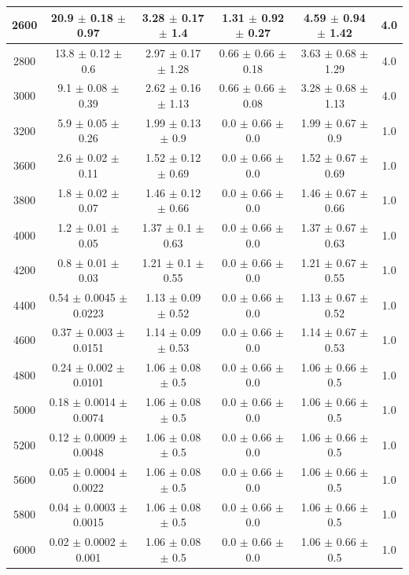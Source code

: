 \begin{table}[htp]
{\begin{tabular}{|c|c|c|c|c|c|}
			2600 & 20.9 $\pm$ 0.18 $\pm$ 0.97 & 3.28 $\pm$ 0.17 $\pm$ 1.4 & 1.31 $\pm$ 0.92 $\pm$ 0.27 & 4.59 $\pm$ 0.94 $\pm$ 1.42 & 4.0     \\ \hline
			2800 & 13.8 $\pm$ 0.12 $\pm$ 0.6 & 2.97 $\pm$ 0.17 $\pm$ 1.28 & 0.66 $\pm$ 0.66 $\pm$ 0.18 & 3.63 $\pm$ 0.68 $\pm$ 1.29 & 4.0     \\ \hline
			3000 & 9.1 $\pm$ 0.08 $\pm$ 0.39 & 2.62 $\pm$ 0.16 $\pm$ 1.13 & 0.66 $\pm$ 0.66 $\pm$ 0.08 & 3.28 $\pm$ 0.68 $\pm$ 1.13 & 4.0     \\ \hline
			3200 & 5.9 $\pm$ 0.05 $\pm$ 0.26 & 1.99 $\pm$ 0.13 $\pm$ 0.9 & 0.0 $\pm$ 0.66 $\pm$ 0.0 & 1.99 $\pm$ 0.67 $\pm$ 0.9 & 1.0     \\ \hline
			3600 & 2.6 $\pm$ 0.02 $\pm$ 0.11 & 1.52 $\pm$ 0.12 $\pm$ 0.69 & 0.0 $\pm$ 0.66 $\pm$ 0.0 & 1.52 $\pm$ 0.67 $\pm$ 0.69 & 1.0     \\ \hline
			3800 & 1.8 $\pm$ 0.02 $\pm$ 0.07 & 1.46 $\pm$ 0.12 $\pm$ 0.66 & 0.0 $\pm$ 0.66 $\pm$ 0.0 & 1.46 $\pm$ 0.67 $\pm$ 0.66 & 1.0     \\ \hline
			4000 & 1.2 $\pm$ 0.01 $\pm$ 0.05 & 1.37 $\pm$ 0.1 $\pm$ 0.63 & 0.0 $\pm$ 0.66 $\pm$ 0.0 & 1.37 $\pm$ 0.67 $\pm$ 0.63 & 1.0     \\ \hline
			4200 & 0.8 $\pm$ 0.01 $\pm$ 0.03 & 1.21 $\pm$ 0.1 $\pm$ 0.55 & 0.0 $\pm$ 0.66 $\pm$ 0.0 & 1.21 $\pm$ 0.67 $\pm$ 0.55 & 1.0     \\ \hline
			4400 & 0.54 $\pm$ 0.0045 $\pm$ 0.0223 & 1.13 $\pm$ 0.09 $\pm$ 0.52 & 0.0 $\pm$ 0.66 $\pm$ 0.0 & 1.13 $\pm$ 0.67 $\pm$ 0.52 & 1.0     \\ \hline
			4600 & 0.37 $\pm$ 0.003 $\pm$ 0.0151 & 1.14 $\pm$ 0.09 $\pm$ 0.53 & 0.0 $\pm$ 0.66 $\pm$ 0.0 & 1.14 $\pm$ 0.67 $\pm$ 0.53 & 1.0     \\ \hline
			4800 & 0.24 $\pm$ 0.002 $\pm$ 0.0101 & 1.06 $\pm$ 0.08 $\pm$ 0.5 & 0.0 $\pm$ 0.66 $\pm$ 0.0 & 1.06 $\pm$ 0.66 $\pm$ 0.5 & 1.0     \\ \hline
			5000 & 0.18 $\pm$ 0.0014 $\pm$ 0.0074 & 1.06 $\pm$ 0.08 $\pm$ 0.5 & 0.0 $\pm$ 0.66 $\pm$ 0.0 & 1.06 $\pm$ 0.66 $\pm$ 0.5 & 1.0     \\ \hline
			5200 & 0.12 $\pm$ 0.0009 $\pm$ 0.0048 & 1.06 $\pm$ 0.08 $\pm$ 0.5 & 0.0 $\pm$ 0.66 $\pm$ 0.0 & 1.06 $\pm$ 0.66 $\pm$ 0.5 & 1.0     \\ \hline
			5600 & 0.05 $\pm$ 0.0004 $\pm$ 0.0022 & 1.06 $\pm$ 0.08 $\pm$ 0.5 & 0.0 $\pm$ 0.66 $\pm$ 0.0 & 1.06 $\pm$ 0.66 $\pm$ 0.5 & 1.0     \\ \hline
			5800 & 0.04 $\pm$ 0.0003 $\pm$ 0.0015 & 1.06 $\pm$ 0.08 $\pm$ 0.5 & 0.0 $\pm$ 0.66 $\pm$ 0.0 & 1.06 $\pm$ 0.66 $\pm$ 0.5 & 1.0     \\ \hline
			6000 & 0.02 $\pm$ 0.0002 $\pm$ 0.001 & 1.06 $\pm$ 0.08 $\pm$ 0.5 & 0.0 $\pm$ 0.66 $\pm$ 0.0 & 1.06 $\pm$ 0.66 $\pm$ 0.5 & 1.0     \\ \hline
	\end{tabular}}
\end{table}
\clearpage

